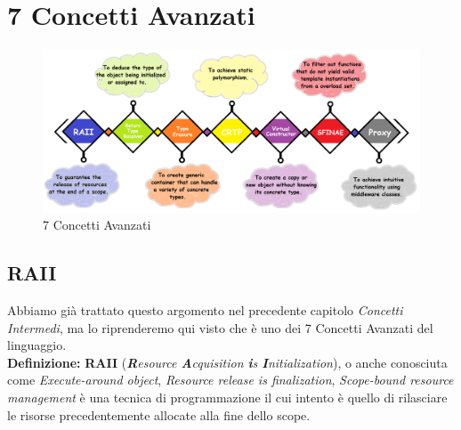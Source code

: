 

\newpage




\section{7 Concetti Avanzati}

\begin{figure}[H]
	\centering
	\includegraphics[width=1.2\textwidth, height=1.2\textheight, keepaspectratio]{./imgs/7-Advanced-C-programming-styles-and-idiom-examples-you-should-know.png}
	\caption{7 Concetti Avanzati}
	\label{fig:7-Advanced-C-programming-styles-and-idiom-examples-you-should-know}
\end{figure}

\subsection{RAII}

\textsf{\small Abbiamo già trattato questo argomento nel precedente capitolo \emph{Concetti Intermedi}, ma lo riprenderemo qui visto che è uno dei 7 Concetti Avanzati del linguaggio.} \\

\textsf{\small \textbf{Definizione: } \textbf{RAII} (\emph{\textbf{R}esource \textbf{A}cquisition \textbf{i}s \textbf{I}nitialization}), o anche conosciuta come \emph{Execute-around object}, \emph{Resource release is finalization}, \emph{Scope-bound resource management} è una tecnica di programmazione il cui intento è quello di rilasciare le risorse precedentemente allocate alla fine dello scope. } \\

